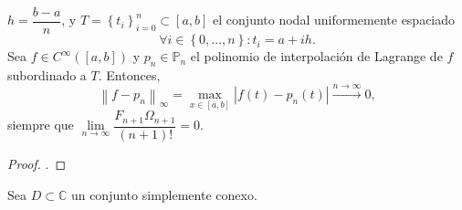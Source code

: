 \begin{frame}
\begin{theorem}
        $h=\dfrac{b-a}{n}$, y
        \begin{math}
            T=
            {
            \left\{
            t_{i}
            \right\}
            }^{n}_{i=0}\subset
            \left[a,b\right]
        \end{math}
        el conjunto nodal uniformemente espaciado
        \begin{equation*}
            \forall i\in\left\{0,\dotsc,n\right\}:
            t_{i}=a+ih.
        \end{equation*}
        Sea $f\in C^{\infty}\left(\left[a,b\right]\right)$ y
        $p_{n}\in\mathbb{P}_{n}$ el polinomio de interpolación de
        Lagrange de $f$ subordinado a $T$.
        Entonces,
        \begin{equation*}
            {\left\|f-p_{n}\right\|}_{\infty}=
            \max_{x\in\left[a,b\right]}
            \left|
            f\left(t\right)-
            p_{n}\left(t\right)
            \right|\xrightarrow{n\to\infty}0,
        \end{equation*}
        siempre que
        \begin{math}
            \lim\limits_{n\to\infty}
            \dfrac{F_{n+1}\Omega_{n+1}}{\left(n+1\right)!}=
            0
        \end{math}.
    \end{theorem}
    \begin{proof}
        .
    \end{proof}
\end{frame}

\begin{frame}
    Sea $D\subset\mathbb{C}$ un conjunto simplemente conexo.
\end{frame}